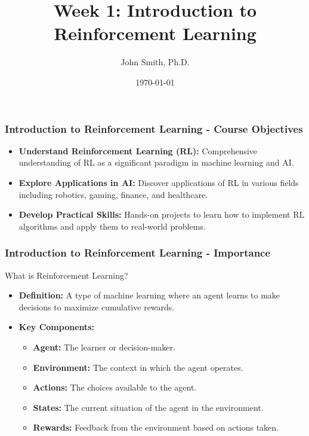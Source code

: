 \documentclass[aspectratio=169]{beamer}
\title[Reinforcement Learning]{Week 1: Introduction to Reinforcement Learning}
\author[J. Smith]{John Smith, Ph.D.}
\institute[University Name]{Department of Computer Science\\University Name\\Email: email@university.edu\\Website: www.university.edu}
\date{\today}
\begin{document}
\frame{\titlepage}

\begin{frame}[fragile]
    \frametitle{Introduction to Reinforcement Learning - Course Objectives}
    \begin{itemize}
        \item \textbf{Understand Reinforcement Learning (RL):} Comprehensive understanding of RL as a significant paradigm in machine learning and AI.
        \item \textbf{Explore Applications in AI:} Discover applications of RL in various fields including robotics, gaming, finance, and healthcare.
        \item \textbf{Develop Practical Skills:} Hands-on projects to learn how to implement RL algorithms and apply them to real-world problems.
    \end{itemize}
\end{frame}

\begin{frame}[fragile]
    \frametitle{Introduction to Reinforcement Learning - Importance}
    \begin{block}{What is Reinforcement Learning?}
        \begin{itemize}
            \item \textbf{Definition:} A type of machine learning where an agent learns to make decisions to maximize cumulative rewards.
            \item \textbf{Key Components:}
            \begin{itemize}
                \item \textbf{Agent:} The learner or decision-maker.
                \item \textbf{Environment:} The context in which the agent operates.
                \item \textbf{Actions:} The choices available to the agent.
                \item \textbf{States:} The current situation of the agent in the environment.
                \item \textbf{Rewards:} Feedback from the environment based on actions taken.
            \end{itemize}
        \end{itemize}
    \end{block}
\end{frame}
\end{document}
